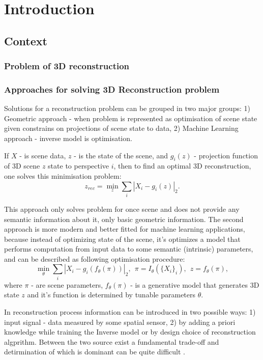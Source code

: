 \chapter{Introduction}

\section{Context}
\subsection{Problem of 3D reconstruction}

\subsection{Approaches for solving 3D Reconstruction problem}

Solutions for a reconstruction problem can be grouped in two major groups: 1) Geometric approach - when problem is represented as optimisation of scene state given constrains on projections of scene state to data, 2) Machine Learning approach - inverse model is optimisation.

If $X$ - is scene data, $z$ - is the state of the scene, and $g_i(z)$ - projection function of 3D scene $z$ state to perspective $i$, then to find an optimal 3D reconstruction, one solves this minimisation problem:
\begin{equation}
z_{rec} = \min_z\sum_i|X_i-g_i(z)|_2 .
\end{equation}

This approach only solves problem for once scene and does not provide any semantic information about it, only basic geometric information. 
The second approach is more modern and better fitted for machine learning applications, because instead of optimizing state of the scene, it's optimizes a model that performs computation from input data to some semantic (intrinsic) parameters, and can be described as following optimisation procedure:
\begin{equation}
\min_\theta\sum_i|X_i-g_i(f_\theta(\pi))|_2,\ \ \pi=I_\theta(\{X_i\}_i),\ \ z=f_\theta(\pi),
\end{equation}
where $\pi$ - are scene parameters, $f_\theta(\pi)$ - is a generative model that generates 3D state $z$ and it's function is determined by tunable parameters $\theta$.

In reconstruction process information can be introduced in two possible ways: 1) input signal - data measured by some spatial sensor, 2) by adding a priori knowledge while training the Inverse model or by design choice of reconstruction algprithm. Between the two source exist a fundamental trade-off and detirmination of which is dominant can be quite difficult \cite{tatarchenko2019single}.


